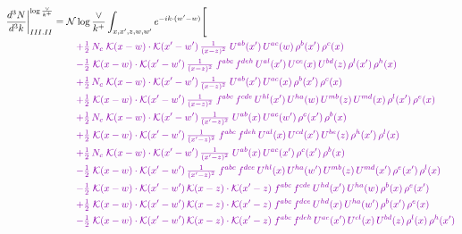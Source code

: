 \documentclass[10pt]{article}
\numberwithin{equation}{section}
\newcommand{\NNv}{\mathcal N\log\frac{\vee}{k^+}}
\begin{document}
\begin{align}
\frac{d^3N}{d^3k}\bigg|^{\log\frac{\vee}{k^+}}_{III.II}={}&\NNv\int_{x,x',z,w,w'}e^{-ik\cdot(w'-w)}\Bigg[\notag\\
&\quad{\color{CC}+\tfrac{1}{2}\,N_c\;\mathcal{K}(x-w)\cdot\mathcal{K}(x'-w')\,\tfrac{1}{(x-z)^{2}}\;U^{ab}(x')\,U^{ac}(w)\,\rho^{b}(x')\,\rho^{c}(x)}\notag\\
&\quad{\color{CC}-\tfrac{1}{2}\;\mathcal{K}(x-w)\cdot\mathcal{K}(x'-w')\,\tfrac{1}{(x-z)^{2}}\;f^{abc}\,f^{deh}\,U^{al}(x')\,U^{ce}(x)\,U^{bd}(z)\,\rho^{l}(x')\,\rho^{h}(x)}\notag\\
&\quad{\color{CC}+\tfrac{1}{2}\,N_c\;\mathcal{K}(x-w)\cdot\mathcal{K}(x'-w')\,\tfrac{1}{(x-z)^{2}}\;U^{ab}(x')\,U^{ac}(x)\,\rho^{b}(x')\,\rho^{c}(x)}\notag\\
&\quad{\color{CC}+\tfrac{1}{2}\;\mathcal{K}(x-w)\cdot\mathcal{K}(x'-w')\,\tfrac{1}{(x-z)^{2}}\;f^{abc}\,f^{cde}\,U^{hl}(x')\,U^{ha}(w)\,U^{mb}(z)\,U^{md}(x)\,\rho^{l}(x')\,\rho^{e}(x)}\notag\\
&\quad{\color{CC}+\tfrac{1}{2}\,N_c\;\mathcal{K}(x-w)\cdot\mathcal{K}(x'-w')\,\tfrac{1}{(x'-z)^{2}}\;U^{ab}(x)\,U^{ac}(w')\,\rho^{c}(x')\,\rho^{b}(x)}\notag\\
&\quad{\color{CC}+\tfrac{1}{2}\;\mathcal{K}(x-w)\cdot\mathcal{K}(x'-w')\,\tfrac{1}{(x'-z)^{2}}\;f^{abc}\,f^{deh}\,U^{al}(x)\,U^{cd}(x')\,U^{be}(z)\,\rho^{h}(x')\,\rho^{l}(x)}\notag\\
&\quad{\color{CC}+\tfrac{1}{2}\,N_c\;\mathcal{K}(x-w)\cdot\mathcal{K}(x'-w')\,\tfrac{1}{(x'-z)^{2}}\;U^{ab}(x)\,U^{ac}(x')\,\rho^{c}(x')\,\rho^{b}(x)}\notag\\
&\quad{\color{CC}-\tfrac{1}{2}\;\mathcal{K}(x-w)\cdot\mathcal{K}(x'-w')\,\tfrac{1}{(x'-z)^{2}}\;f^{abc}\,f^{dce}\,U^{hl}(x)\,U^{ha}(w')\,U^{mb}(z)\,U^{md}(x')\,\rho^{e}(x')\,\rho^{l}(x)}\notag\\
&\quad{\color{CC}-\tfrac{1}{2}\;\mathcal{K}(x-w)\cdot\mathcal{K}(x'-w')\,\mathcal{K}(x-z)\cdot\mathcal{K}(x'-z)\;f^{abc}\,f^{cde}\,U^{hd}(x')\,U^{ha}(w)\,\rho^{b}(x)\,\rho^{e}(x')}\notag\\
&\quad{\color{CC}+\tfrac{1}{2}\;\mathcal{K}(x-w)\cdot\mathcal{K}(x'-w')\,\mathcal{K}(x-z)\cdot\mathcal{K}(x'-z)\;f^{abc}\,f^{dce}\,U^{hd}(x)\,U^{ha}(w')\,\rho^{b}(x')\,\rho^{e}(x)}\notag\\
&\quad{\color{CC}-\tfrac{1}{2}\;\mathcal{K}(x-w)\cdot\mathcal{K}(x'-w')\,\mathcal{K}(x-z)\cdot\mathcal{K}(x'-z)\;f^{abc}\,f^{deh}\,U^{ae}(x')\,U^{cl}(x)\,U^{bd}(z)\,\rho^{l}(x)\,\rho^{h}(x')}\notag\\

\end{align}
\end{document}
